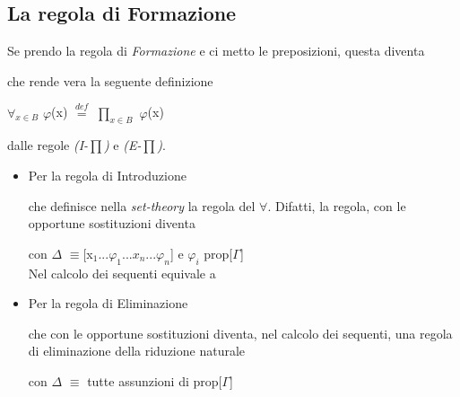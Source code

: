 \subsection{La regola di Formazione}
\label{subsec:osservazioni-formazione-prodotto-dip}
Se prendo la regola di \textit{Formazione} e ci metto le preposizioni, questa diventa
\begin{prooftree}
\end{prooftree}
\noindent
che rende vera la seguente definizione
\begin{center}$\forall_{x \in B}$ $\varphi$(x) ${\overset{\mathit{def}}{=}}$ $\prod\limits_{x \in B}$ $\varphi$(x)\end{center}
dalle regole \textit{(I-{\scriptsize$\prod$})} e \textit{(E-{\scriptsize$\prod$})}.\\
\begin{itemize}
\item Per la regola di Introduzione
\begin{prooftree}
\end{prooftree}
\noindent
che definisce nella \textit{set-theory} la regola del $\forall$. Difatti, la regola, con le opportune sostituzioni diventa
\begin{prooftree}
\end{prooftree}
\noindent
con $\Delta$ $\equiv$[x$_1$...$\varphi_1$...$x_n$...$\varphi_n$] e $\varphi_i$ prop[$\Gamma$]\\
Nel calcolo dei sequenti equivale a
\begin{prooftree}
\end{prooftree}
\noindent 
\item Per la regola di Eliminazione
\begin{prooftree}
\end{prooftree}
\noindent
che con le opportune sostituzioni diventa, nel calcolo dei sequenti, una regola di eliminazione della riduzione naturale
\begin{prooftree}
\end{prooftree}
con $\Delta$ $\equiv$ tutte assunzioni di prop[$\Gamma$]
\noindent
\end{itemize}
